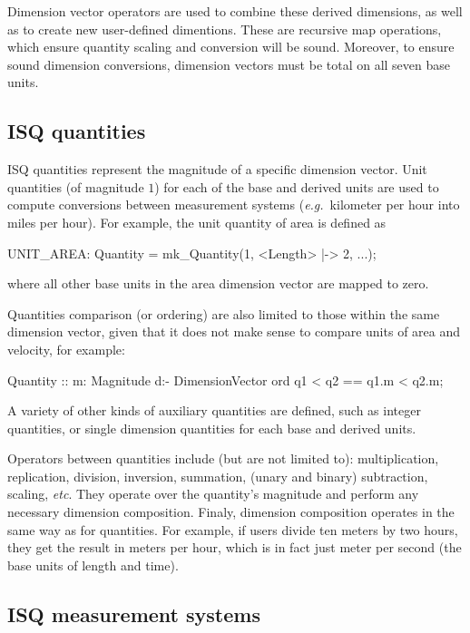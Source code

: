 \documentclass[runningheads,a4paper]{llncs}
\begin{document}
Dimension vector operators are used to combine these derived dimensions, as well as to create new user-defined dimentions. These are recursive map operations, which ensure quantity scaling and conversion will be sound. Moreover, to ensure sound dimension conversions, dimension vectors must be total on all seven base units.      

\subsection*{ISQ quantities}

ISQ quantities represent the magnitude of a specific dimension vector. Unit quantities (of magnitude \(1\)) for each of the base and derived units are used to compute conversions between measurement systems (\textit{e.g.}~kilometer per hour into miles per hour). For example, the unit quantity of area is defined as
%
\begin{vdmsl}[frame=none,basicstyle=\ttfamily\scriptsize]
    UNIT_AREA: Quantity = mk_Quantity(1, {<Length> |-> 2, ...});
\end{vdmsl}
%
\noindent where all other base units in the area dimension vector are mapped to zero. 

Quantities comparison (or ordering) are also limited to those within the same dimension vector, given that it does not make sense to compare units of area and velocity, for example:
%
\begin{vdmsl}[frame=none,basicstyle=\ttfamily\scriptsize]
    Quantity :: m: Magnitude d:- DimensionVector 
    ord q1 < q2 == q1.m < q2.m; 
\end{vdmsl}
%  
\noindent A variety of other kinds of auxiliary quantities are defined, such as integer quantities, or single dimension quantities for each base and derived units.  

Operators between quantities include (but are not limited to): multiplication, replication, division, inversion, summation, (unary and binary) subtraction, scaling, \textit{etc}. They operate over the quantity's magnitude and perform any necessary dimension composition. Finaly, dimension composition operates in the same way as for quantities. For example, if users divide ten meters by two hours, they get the result in meters per hour, which is in fact just meter per second (the base units of length and time).    

\subsection*{ISQ measurement systems}
\end{document}
